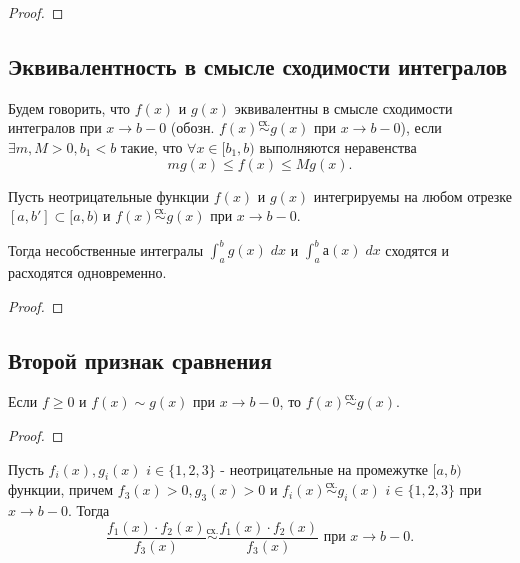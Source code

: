 	\begin{proof}
	\end{proof}
	
	\subsection{Эквивалентность в смысле сходимости интегралов}
	
	\begin{definition}
		Будем говорить, что $f(x)$ и $g(x)$ эквивалентны в смысле
		сходимости интегралов при $x \rightarrow b - 0$ (обозн. $f(x) \overset{\text{сх.}}{\sim} g(x)$ при $x \rightarrow b - 0$), если $\exists m, M > 0, b_1 < b$ такие, что $\forall x \in [b_1, b)$ выполняются неравенства
		\[ mg(x) \leqslant f(x) \leqslant Mg(x).\]
	\end{definition}
	
	\begin{theorem}
		Пусть неотрицательные функции $f(x)$ и $g(x)$ интегрируемы на
		любом отрезке $[a, b'] \subset [a, b)$ и $f(x) \overset{\text{сх.}}{\sim} g(x)$ при $x \rightarrow b - 0$.
		
		Тогда несобственные интегралы $\int_a^b g(x) \; dx$ и $\int_a^b а(x) \; dx$ сходятся и расходятся одновременно.
	\end{theorem}
	
	\begin{proof}
	\end{proof}
	
	\subsection{Второй признак сравнения}
	
	\begin{sentence}
		Если $f \geqslant 0$ и $f(x) \sim g(x)$ при $x \rightarrow b - 0$, то $f(x) \overset{\text{сх.}}{\sim} g(x)$.
	\end{sentence}
	
	\begin{proof}
	\end{proof}
	
	\begin{sentence}
		Пусть $f_i(x), g_i(x)$ $i \in \{1, 2, 3\}$ - неотрицательные на
		промежутке $[a, b)$ функции, причем $f_3(x) > 0, g_3(x) > 0$ и
		$f_i(x) \overset{\text{сх.}}{\sim} g_i(x)$ $i \in \{1, 2, 3\}$ при $x \rightarrow b - 0$. Тогда
		\[ \frac{f_1(x) \cdot f_2(x)}{f_3(x)} \overset{\text{сх.}}{\sim} \frac{f_1(x) \cdot f_2(x)}{f_3(x)} \text{ при } x \rightarrow b - 0.\]
	\end{sentence}
	
